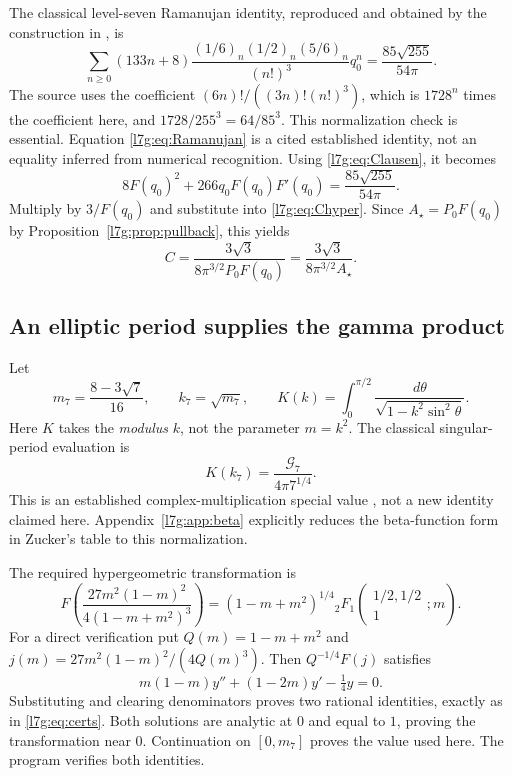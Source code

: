 \documentclass[11pt,letterpaper]{article}
\theoremstyle{remark}\newtheorem{remark}[theorem]{Remark}
\newcommand{\G}{\mathcal G_7}\newcommand{\Ast}{A_\star}
\newcommand{\hyp}[4]{{}_2F_1\!\left(\begin{matrix}#1,#2\\#3\end{matrix};#4\right)}
\newcounter{l7gtrsavedeq}
\begin{document}
The classical level-seven Ramanujan identity, reproduced and obtained
by the construction in \cite[Eq.~(98)]{l7g:hemmecke}, is
\begin{equation}\label{l7g:eq:Ramanujan}
 \sum_{n\ge0}(133n+8)
   \frac{(1/6)_n(1/2)_n(5/6)_n}{(n!)^3}q_0^n
      =\frac{85\sqrt{255}}{54\pi}.
\end{equation}
The source uses the coefficient $(6n)!/((3n)!(n!)^3)$, which is $1728^n$
times the coefficient here, and $1728/255^3=64/85^3$. This normalization
check is essential. Equation \eqref{l7g:eq:Ramanujan} is a cited established
identity, not an equality inferred from numerical recognition.
Using \eqref{l7g:eq:Clausen}, it becomes
\[
 8F(q_0)^2+266q_0F(q_0)F'(q_0)=\frac{85\sqrt{255}}{54\pi}.
\]
Multiply by $3/F(q_0)$ and substitute into \eqref{l7g:eq:Chyper}. Since
$\Ast=P_0F(q_0)$ by Proposition~\ref{l7g:prop:pullback}, this yields
\begin{equation}\label{l7g:eq:Creciprocal}
 C=\frac{3\sqrt3}{8\pi^{3/2}P_0F(q_0)}
   =\frac{3\sqrt3}{8\pi^{3/2}\Ast}.
\end{equation}

\subsection{An elliptic period supplies the gamma product}
Let
\begin{equation}\label{l7g:eq:m7}
 m_7=\frac{8-3\sqrt7}{16},\qquad k_7=\sqrt{m_7},\qquad
 K(k)=\int_0^{\pi/2}\frac{d\theta}{\sqrt{1-k^2\sin^2\theta}}.
\end{equation}
Here $K$ takes the \emph{modulus} $k$, not the parameter $m=k^2$.
The classical singular-period evaluation is
\begin{equation}\label{l7g:eq:Kgamma}
 K(k_7)=\frac{\G}{4\pi7^{1/4}}.
\end{equation}
This is an established complex-multiplication special value
\cite{l7g:borweinzucker,l7g:beta}, not a new identity claimed here.
Appendix~\ref{l7g:app:beta} explicitly reduces the beta-function form in
Zucker's table to this normalization.

The required hypergeometric transformation is
\begin{equation}\label{l7g:eq:elliptictransform}
 F\!\left(\frac{27m^2(1-m)^2}{4(1-m+m^2)^3}\right)
 =(1-m+m^2)^{1/4}\hyp{1/2}{1/2}{1}{m}.
\end{equation}
For a direct verification put $Q(m)=1-m+m^2$ and
$j(m)=27m^2(1-m)^2/(4Q(m)^3)$. Then $Q^{-1/4}F(j)$ satisfies
\[
 m(1-m)y''+(1-2m)y'-\tfrac14y=0.
\]
Substituting and clearing denominators proves two rational identities,
exactly as in \eqref{l7g:eq:certs}. Both solutions are analytic at $0$ and
equal to $1$, proving the transformation near $0$. Continuation on
$[0,m_7]$ proves the value used here. The program verifies both identities.
\end{document}
